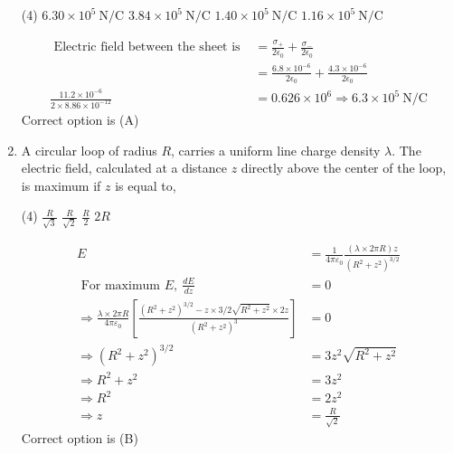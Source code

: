 \begin{enumerate}[label=\color{ocre}\textbf{\arabic*.}]
{}
\begin{tasks}(4)
\task[\textbf{A.}] $6.30 \times 10^{5} \mathrm{~N} / \mathrm{C}$
\task[\textbf{B.}]$3.84 \times 10^{5} \mathrm{~N} / \mathrm{C}$
\task[\textbf{C.}] $1.40 \times 10^{5} \mathrm{~N} / \mathrm{C}$
\task[\textbf{D.}] $1.16 \times 10^{5} \mathrm{~N} / \mathrm{C}$ 
\end{tasks}
\begin{answer}
\begin{align*}
\text { Electric field between the sheet is }&=\frac{\sigma_{+}}{2 \epsilon_{0}}+\frac{\sigma_{-}}{2 \epsilon_{0}}\\&=\frac{6.8 \times 10^{-6}}{2 \epsilon_{0}}+\frac{4.3 \times 10^{-6}}{2 \epsilon_{0}}\\
\frac{11.2 \times 10^{-6}}{2 \times 8.86 \times 10^{-12}}&=0.626 \times 10^{6} \Rightarrow 6.3 \times 10^{5} \mathrm{~N} / \mathrm{C}
\end{align*}
Correct option is (A)
\end{answer}
\item A circular loop of radius $R$, carries a uniform line charge density $\lambda$. The electric field,
calculated at a distance $z$ directly above the center of the loop, is maximum if $z$ is equal
to,
{}
\begin{tasks}(4)
\task[\textbf{A.}] $\frac{R}{\sqrt{3}}$
\task[\textbf{B.}] $\frac{R}{\sqrt{2}}$
\task[\textbf{C.}]$\frac{R}{2}$
\task[\textbf{D.}]$2 R$ 
\end{tasks}
\begin{answer}
\begin{align*}
E&=\frac{1}{4 \pi \varepsilon_{0}} \frac{(\lambda \times 2 \pi R) z}{\left(R^{2}+z^{2}\right)^{3 / 2}} \\
\text { For maximum } E,\  \frac{d E}{d z}&=0 \\\Rightarrow \frac{\lambda \times 2 \pi R}{4 \pi \varepsilon_{0}}\left[\frac{\left(R^{2}+z^{2}\right)^{3 / 2}-z \times 3 / 2 \sqrt{R^{2}+z^{2}} \times 2 z}{\left(R^{2}+z^{2}\right)^{3}}\right]&=0 \\
\Rightarrow\left(R^{2}+z^{2}\right)^{3 / 2}&=3 z^{2} \sqrt{R^{2}+z^{2}}\\ \Rightarrow R^{2}+z^{2}&=3 z^{2}\\ \Rightarrow R^{2}&=2 z^{2}\\ \Rightarrow z&=\frac{R}{\sqrt{2}}
\end{align*}
Correct option is (B)
\end{answer}
\end{enumerate}
